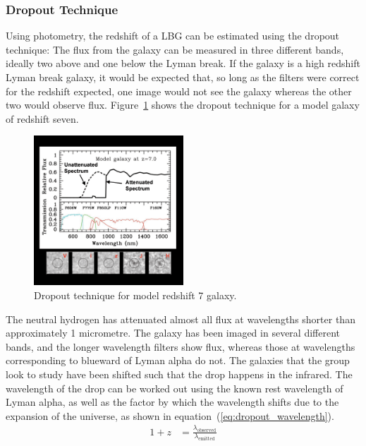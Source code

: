 		\subsubsection{Dropout Technique} %
		\label{ssub:dropout_technique}
			Using photometry, the redshift of a LBG can be estimated using the dropout technique: The flux from the galaxy can be measured in three different bands, ideally two above and one below the Lyman break. If the galaxy is a high redshift Lyman break galaxy, it would be expected that, so long as the filters were correct for the redshift expected, one image would not see the galaxy whereas the other two would observe flux. Figure~\ref{fig:drop_out_at_z7} shows the dropout technique for a model galaxy of redshift seven.
			\begin{figure}[htbp]
				\centering
				\includegraphics[width=0.5\textwidth]{../Images/drop_out_at_z7.png}
				\caption{Dropout technique for model redshift 7 galaxy\cite{first_galaxies_dropout_at_z7}.\label{fig:drop_out_at_z7}}
			\end{figure}

			The neutral hydrogen has attenuated almost all flux at wavelengths shorter than approximately 1 micrometre. The galaxy has been imaged in several different bands, and the longer wavelength filters show flux, whereas those at wavelengths corresponding to blueward of Lyman alpha do not. The galaxies that the group look to study have been shifted such that the drop happens in the infrared. The wavelength of the drop can be worked out using the known rest wavelength of Lyman alpha, as well as the factor by which the wavelength shifts due to the expansion of the universe, as shown in equation~(\ref{eq:dropout_wavelength}).
			\begin{align}
				1+z &= \frac{\lambda_{\text{observed}}}{\lambda_{\text{emitted}}}\label{eq:dropout_wavelength}
			\end{align}

